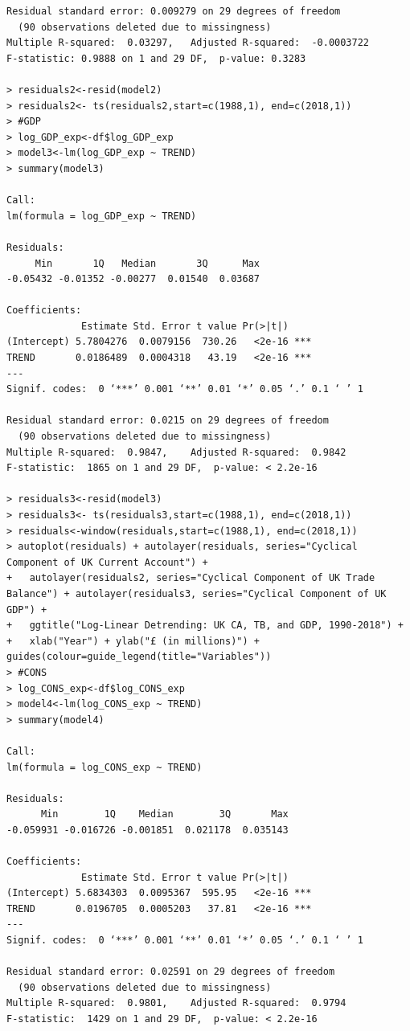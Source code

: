 \documentclass[12pt]{article}
\begin{document}
\begin{verbatim}
Residual standard error: 0.009279 on 29 degrees of freedom
  (90 observations deleted due to missingness)
Multiple R-squared:  0.03297,	Adjusted R-squared:  -0.0003722 
F-statistic: 0.9888 on 1 and 29 DF,  p-value: 0.3283

> residuals2<-resid(model2)
> residuals2<- ts(residuals2,start=c(1988,1), end=c(2018,1))
> #GDP
> log_GDP_exp<-df$log_GDP_exp
> model3<-lm(log_GDP_exp ~ TREND)
> summary(model3)

Call:
lm(formula = log_GDP_exp ~ TREND)

Residuals:
     Min       1Q   Median       3Q      Max 
-0.05432 -0.01352 -0.00277  0.01540  0.03687 

Coefficients:
             Estimate Std. Error t value Pr(>|t|)    
(Intercept) 5.7804276  0.0079156  730.26   <2e-16 ***
TREND       0.0186489  0.0004318   43.19   <2e-16 ***
---
Signif. codes:  0 ‘***’ 0.001 ‘**’ 0.01 ‘*’ 0.05 ‘.’ 0.1 ‘ ’ 1

Residual standard error: 0.0215 on 29 degrees of freedom
  (90 observations deleted due to missingness)
Multiple R-squared:  0.9847,	Adjusted R-squared:  0.9842 
F-statistic:  1865 on 1 and 29 DF,  p-value: < 2.2e-16

> residuals3<-resid(model3)
> residuals3<- ts(residuals3,start=c(1988,1), end=c(2018,1))
> residuals<-window(residuals,start=c(1988,1), end=c(2018,1)) 
> autoplot(residuals) + autolayer(residuals, series="Cyclical Component of UK Current Account") +
+   autolayer(residuals2, series="Cyclical Component of UK Trade Balance") + autolayer(residuals3, series="Cyclical Component of UK GDP") +
+   ggtitle("Log-Linear Detrending: UK CA, TB, and GDP, 1990-2018") + 
+   xlab("Year") + ylab("£ (in millions)") + guides(colour=guide_legend(title="Variables"))
> #CONS
> log_CONS_exp<-df$log_CONS_exp
> model4<-lm(log_CONS_exp ~ TREND)
> summary(model4)

Call:
lm(formula = log_CONS_exp ~ TREND)

Residuals:
      Min        1Q    Median        3Q       Max 
-0.059931 -0.016726 -0.001851  0.021178  0.035143 

Coefficients:
             Estimate Std. Error t value Pr(>|t|)    
(Intercept) 5.6834303  0.0095367  595.95   <2e-16 ***
TREND       0.0196705  0.0005203   37.81   <2e-16 ***
---
Signif. codes:  0 ‘***’ 0.001 ‘**’ 0.01 ‘*’ 0.05 ‘.’ 0.1 ‘ ’ 1

Residual standard error: 0.02591 on 29 degrees of freedom
  (90 observations deleted due to missingness)
Multiple R-squared:  0.9801,	Adjusted R-squared:  0.9794 
F-statistic:  1429 on 1 and 29 DF,  p-value: < 2.2e-16


\end{verbatim}
\end{document}

